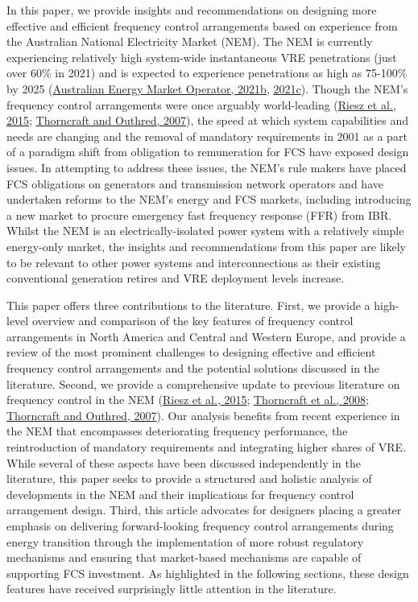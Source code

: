 \documentclass[12pt,a4paper,]{report}
\begin{document}
In this paper, we provide insights and recommendations on designing more
effective and efficient frequency control arrangements based on
experience from the Australian National Electricity Market (NEM). The
NEM is currently experiencing relatively high system-wide instantaneous
VRE penetrations (just over 60\% in 2021) and is expected to experience
penetrations as high as 75-100\% by 2025
(\protect\hyperlink{ref-australianenergymarketoperatorNEMEngineeringFramework2021}{Australian
Energy Market Operator, 2021b},
\protect\hyperlink{ref-australianenergymarketoperatorQuarterlyEnergyDynamics2021}{2021c}).
Though the NEM's frequency control arrangements were once arguably
world-leading
(\protect\hyperlink{ref-rieszFrequencyControlAncillary2015}{Riesz et
al., 2015};
\protect\hyperlink{ref-thorncraftExperienceMarketbasedAncillary2007}{Thorncraft
and Outhred, 2007}), the speed at which system capabilities and needs
are changing and the removal of mandatory requirements in 2001 as a part
of a paradigm shift from obligation to remuneration for FCS have exposed
design issues. In attempting to address these issues, the NEM's rule
makers have placed FCS obligations on generators and transmission
network operators and have undertaken reforms to the NEM's energy and
FCS markets, including introducing a new market to procure emergency
fast frequency response (FFR) from IBR. Whilst the NEM is an
electrically-isolated power system with a relatively simple energy-only
market, the insights and recommendations from this paper are likely to
be relevant to other power systems and interconnections as their
existing conventional generation retires and VRE deployment levels
increase.

This paper offers three contributions to the literature. First, we
provide a high-level overview and comparison of the key features of
frequency control arrangements in North America and Central and Western
Europe, and provide a review of the most prominent challenges to
designing effective and efficient frequency control arrangements and the
potential solutions discussed in the literature. Second, we provide a
comprehensive update to previous literature on frequency control in the
NEM (\protect\hyperlink{ref-rieszFrequencyControlAncillary2015}{Riesz et
al., 2015};
\protect\hyperlink{ref-thorncraftMarketbasedAncillaryServices2008}{Thorncraft
et al., 2008};
\protect\hyperlink{ref-thorncraftExperienceMarketbasedAncillary2007}{Thorncraft
and Outhred, 2007}). Our analysis benefits from recent experience in the
NEM that encompasses deteriorating frequency performance, the
reintroduction of mandatory requirements and integrating higher shares
of VRE. While several of these aspects have been discussed independently
in the literature, this paper seeks to provide a structured and holistic
analysis of developments in the NEM and their implications for frequency
control arrangement design. Third, this article advocates for designers
placing a greater emphasis on delivering forward-looking frequency
control arrangements during energy transition through the implementation
of more robust regulatory mechanisms and ensuring that market-based
mechanisms are capable of supporting FCS investment. As highlighted in
the following sections, these design features have received surprisingly
little attention in the literature.
\end{document}
